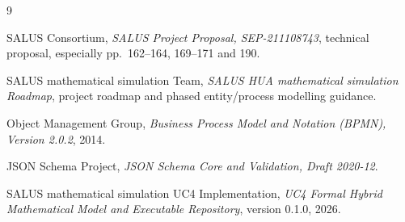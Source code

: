 ﻿\documentclass[10pt,a4paper,twocolumn]{article}
\begin{document}
\begin{thebibliography}{9}

SALUS Consortium,
\emph{SALUS Project Proposal, SEP-211108743},
technical proposal, especially pp.~162--164, 169--171 and 190.

SALUS mathematical simulation Team,
\emph{SALUS HUA mathematical simulation Roadmap},
project roadmap and phased entity/process modelling guidance.

Object Management Group,
\emph{Business Process Model and Notation (BPMN), Version 2.0.2}, 2014.

JSON Schema Project,
\emph{JSON Schema Core and Validation, Draft 2020-12}.

SALUS mathematical simulation UC4 Implementation,
\emph{UC4 Formal Hybrid Mathematical Model and Executable Repository}, version 0.1.0, 2026.

\end{thebibliography}
\end{document}

